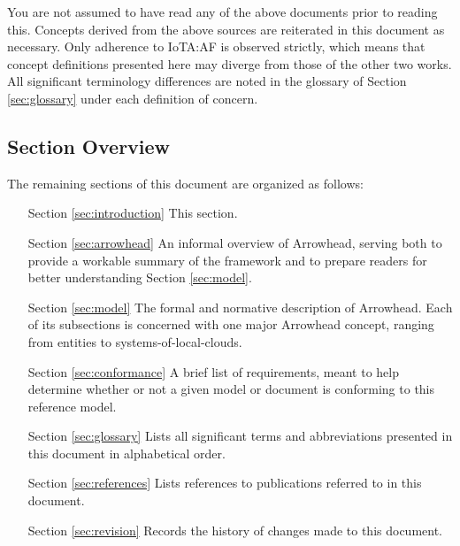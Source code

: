 You are not assumed to have read any of the above documents prior to reading this.
Concepts derived from the above sources are reiterated in this document as necessary.
Only adherence to IoTA:AF is observed strictly, which means that concept definitions presented here may diverge from those of the other two works.
All significant terminology differences are noted in the glossary of Section \ref{sec:glossary} under each definition of concern.

\subsection{Section Overview}
\label{sec:introduction:sections}

The remaining sections of this document are organized as follows:
\vspace*{2mm}
\begin{itemize}[leftmargin=2cm,rightmargin=0pt,labelwidth=2cm,labelsep=0pt,itemindent=0pt,parsep=0.1cm,topsep=0.1cm,align=left]

\item[Section \ref{sec:introduction}]
This section.

\item[Section \ref{sec:arrowhead}]
An informal overview of Arrowhead, serving both to provide a workable summary of the framework and to prepare readers for better understanding Section \ref{sec:model}.

\item[Section \ref{sec:model}]
The formal and normative description of Arrowhead.
Each of its subsections is concerned with one major Arrowhead concept, ranging from entities to systems-of-local-clouds.

\item[Section \ref{sec:conformance}]
A brief list of requirements, meant to help determine whether or not a given model or document is conforming to this reference model.

\item[Section \ref{sec:glossary}]
Lists all significant terms and abbreviations presented in this document in alphabetical order.

\item[Section \ref{sec:references}]
Lists references to publications referred to in this document.

\item[Section \ref{sec:revision}]
Records the history of changes made to this document.

\end{itemize}
